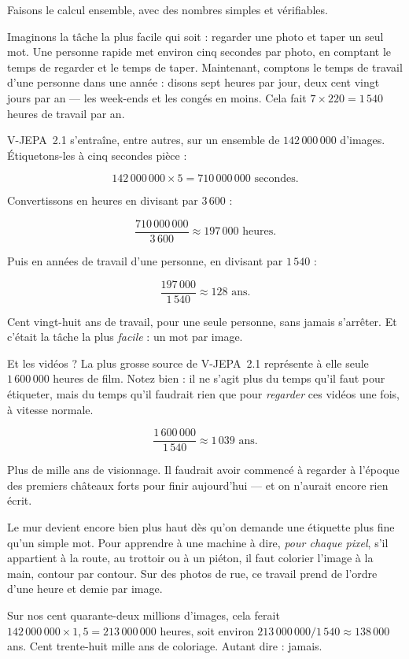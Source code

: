 Faisons le calcul ensemble, avec des nombres simples et vérifiables.

Imaginons la tâche la plus facile qui soit : regarder une photo et taper un
seul mot. Une personne rapide met environ cinq secondes par photo, en
comptant le temps de regarder et le temps de taper. Maintenant, comptons le
temps de travail d'une personne dans une année : disons sept heures par jour,
deux cent vingt jours par an — les week-ends et les congés en moins. Cela
fait $7 \times 220 = 1\,540$ heures de travail par an.

\begin{exemple}
V-JEPA~2.1 s'entraîne, entre autres, sur un ensemble de $142\,000\,000$
d'images. Étiquetons-les à cinq secondes pièce :

\[
  142\,000\,000 \times 5 = 710\,000\,000 \text{ secondes.}
\]

Convertissons en heures en divisant par $3\,600$ :

\[
  \frac{710\,000\,000}{3\,600} \approx 197\,000 \text{ heures.}
\]

Puis en années de travail d'une personne, en divisant par $1\,540$ :

\[
  \frac{197\,000}{1\,540} \approx 128 \text{ ans.}
\]

Cent vingt-huit ans de travail, pour une seule personne, sans jamais
s'arrêter. Et c'était la tâche la plus \emph{facile} : un mot par image.
\end{exemple}

Et les vidéos ? La plus grosse source de V-JEPA~2.1 représente à elle seule
$1\,600\,000$ heures de film. Notez bien : il ne s'agit plus du temps qu'il
faut pour étiqueter, mais du temps qu'il faudrait rien que pour
\emph{regarder} ces vidéos une fois, à vitesse normale.

\[
  \frac{1\,600\,000}{1\,540} \approx 1\,039 \text{ ans.}
\]

Plus de mille ans de visionnage. Il faudrait avoir commencé à regarder à
l'époque des premiers châteaux forts pour finir aujourd'hui — et on n'aurait
encore rien écrit.

\begin{surlesdonnees}
Le mur devient encore bien plus haut dès qu'on demande une étiquette plus
fine qu'un simple mot. Pour apprendre à une machine à dire, \emph{pour chaque
pixel}, s'il appartient à la route, au trottoir ou à un piéton, il faut
colorier l'image à la main, contour par contour. Sur des photos de rue, ce
travail prend de l'ordre d'une heure et demie par image.

Sur nos cent quarante-deux millions d'images, cela ferait
$142\,000\,000 \times 1{,}5 = 213\,000\,000$ heures, soit environ
$213\,000\,000 / 1\,540 \approx 138\,000$ ans. Cent trente-huit mille ans de
coloriage. Autant dire : jamais.
\end{surlesdonnees}

